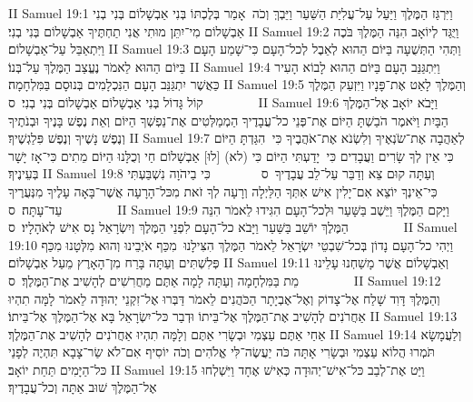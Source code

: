 II Samuel 19:1	וַיִּרְגַּז הַמֶּלֶךְ וַיַּעַל עַל־עֲלִיַּת הַשַּׁעַר וַיֵּבְךְּ וְכֹה  אָמַר בְּלֶכְתּוֹ בְּנִי אַבְשָׁלוֹם בְּנִי בְנִי אַבְשָׁלוֹם מִי־יִתֵּן מוּתִי אֲנִי תַחְתֶּיךָ אַבְשָׁלוֹם בְּנִי בְנִי׃
II Samuel 19:2	וַיֻּגַּד לְיוֹאָב הִנֵּה הַמֶּלֶךְ בֹּכֶה וַיִּתְאַבֵּל עַל־אַבְשָׁלוֹם׃
II Samuel 19:3	וַתְּהִי הַתְּשֻׁעָה בַּיּוֹם הַהוּא לְאֵבֶל לְכל־הָעָם כִּי־שָׁמַע הָעָם בַּיּוֹם הַהוּא לֵאמֹר נֶעֱצַב הַמֶּלֶךְ עַל־בְּנוֹ׃
II Samuel 19:4	וַיִּתְגַּנֵּב הָעָם בַּיּוֹם הַהוּא לָבוֹא הָעִיר כַּאֲשֶׁר יִתְגַּנֵּב הָעָם הַנִּכְלָמִים בְּנוּסָם בַּמִּלְחָמָה׃
II Samuel 19:5	וְהַמֶּלֶךְ לָאַט אֶת־פָּנָיו וַיִּזְעַק הַמֶּלֶךְ קוֹל גָּדוֹל בְּנִי אַבְשָׁלוֹם אַבְשָׁלוֹם בְּנִי בְנִי׃ {ס}        
II Samuel 19:6	וַיָּבֹא יוֹאָב אֶל־הַמֶּלֶךְ הַבָּיִת וַיֹּאמֶר הֹבַשְׁתָּ הַיּוֹם אֶת־פְּנֵי כל־עֲבָדֶיךָ הַמְמַלְּטִים אֶת־נַפְשְׁךָ הַיּוֹם וְאֵת נֶפֶשׁ בָּנֶיךָ וּבְנֹתֶיךָ וְנֶפֶשׁ נָשֶׁיךָ וְנֶפֶשׁ פִּלַגְשֶׁיךָ׃
II Samuel 19:7	לְאַהֲבָה אֶת־שֹׂנְאֶיךָ וְלִשְׂנֹא אֶת־אֹהֲבֶיךָ כִּי  הִגַּדְתָּ הַיּוֹם כִּי אֵין לְךָ שָׂרִים וַעֲבָדִים כִּי  יָדַעְתִּי הַיּוֹם כִּי (לא) [לוּ] אַבְשָׁלוֹם חַי וְכֻלָּנוּ הַיּוֹם מֵתִים כִּי־אָז יָשָׁר בְּעֵינֶיךָ׃
II Samuel 19:8	וְעַתָּה קוּם צֵא וְדַבֵּר עַל־לֵב עֲבָדֶיךָ {ס}        כִּי בַיהֹוָה נִשְׁבַּעְתִּי כִּי־אֵינְךָ יוֹצֵא אִם־יָלִין אִישׁ אִתְּךָ הַלַּיְלָה וְרָעָה לְךָ זֹאת מִכּל־הָרָעָה אֲשֶׁר־בָּאָה עָלֶיךָ מִנְּעֻרֶיךָ עַד־עָתָּה׃ {ס}        
II Samuel 19:9	וַיָּקם הַמֶּלֶךְ וַיֵּשֶׁב בַּשָּׁעַר וּלְכל־הָעָם הִגִּידוּ לֵאמֹר הִנֵּה הַמֶּלֶךְ יוֹשֵׁב בַּשַּׁעַר וַיָּבֹא כל־הָעָם לִפְנֵי הַמֶּלֶךְ וְיִשְׂרָאֵל נָס אִישׁ לְאֹהָלָיו׃ {ס}        
II Samuel 19:10	וַיְהִי כל־הָעָם נָדוֹן בְּכל־שִׁבְטֵי יִשְׂרָאֵל לֵאמֹר הַמֶּלֶךְ הִצִּילָנוּ  מִכַּף אֹיְבֵינוּ וְהוּא מִלְּטָנוּ מִכַּף פְּלִשְׁתִּים וְעַתָּה בָּרַח מִן־הָאָרֶץ מֵעַל אַבְשָׁלוֹם׃
II Samuel 19:11	וְאַבְשָׁלוֹם אֲשֶׁר מָשַׁחְנוּ עָלֵינוּ מֵת בַּמִּלְחָמָה וְעַתָּה לָמָה אַתֶּם מַחֲרִשִׁים לְהָשִׁיב אֶת־הַמֶּלֶךְ׃ {ס}        
II Samuel 19:12	וְהַמֶּלֶךְ דָּוִד שָׁלַח אֶל־צָדוֹק וְאֶל־אֶבְיָתָר הַכֹּהֲנִים לֵאמֹר דַּבְּרוּ אֶל־זִקְנֵי יְהוּדָה לֵאמֹר לָמָּה תִהְיוּ אַחֲרֹנִים לְהָשִׁיב אֶת־הַמֶּלֶךְ אֶל־בֵּיתוֹ וּדְבַר כּל־יִשְׂרָאֵל בָּא אֶל־הַמֶּלֶךְ אֶל־בֵּיתוֹ׃
II Samuel 19:13	אַחַי אַתֶּם עַצְמִי וּבְשָׂרִי אַתֶּם וְלָמָּה תִהְיוּ אַחֲרֹנִים לְהָשִׁיב אֶת־הַמֶּלֶךְ׃
II Samuel 19:14	וְלַעֲמָשָׂא תֹּמְרוּ הֲלוֹא עַצְמִי וּבְשָׂרִי אָתָּה כֹּה יַעֲשֶׂה־לִּי אֱלֹהִים וְכֹה יוֹסִיף אִם־לֹא שַׂר־צָבָא תִּהְיֶה לְפָנַי כּל־הַיָּמִים תַּחַת יוֹאָב׃
II Samuel 19:15	וַיַּט אֶת־לְבַב כּל־אִישׁ־יְהוּדָה כְּאִישׁ אֶחָד וַיִּשְׁלְחוּ אֶל־הַמֶּלֶךְ שׁוּב אַתָּה וְכל־עֲבָדֶיךָ׃

